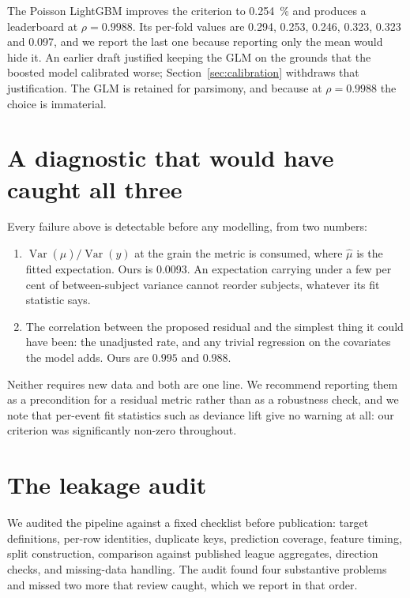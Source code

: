 \documentclass[11pt,a4paper]{article}
\begin{document}
The Poisson LightGBM improves the criterion to \SI{0.254}{\percent} and produces
a leaderboard at $\rho = 0.9988$. Its per-fold values are 0.294, 0.253, 0.246,
0.323, 0.323 and 0.097, and we report the last one because reporting only the
mean would hide it. An earlier draft justified keeping the GLM on the grounds
that the boosted model calibrated worse; Section~\ref{sec:calibration} withdraws
that justification. The GLM is retained for parsimony, and because at
$\rho = 0.9988$ the choice is immaterial.

\section{A diagnostic that would have caught all three}
\label{sec:diagnostic}

Every failure above is detectable before any modelling, from two numbers:

\begin{enumerate}
\item $\operatorname{Var}(\hat{\mu}) / \operatorname{Var}(y)$ at the grain the
metric is consumed, where $\hat\mu$ is the fitted expectation. Ours is
\num{0.0093}. An expectation carrying under a few per cent of between-subject
variance cannot reorder subjects, whatever its fit statistic says.
\item The correlation between the proposed residual and the simplest thing it
could have been: the unadjusted rate, and any trivial regression on the
covariates the model adds. Ours are $0.995$ and $0.988$.
\end{enumerate}

Neither requires new data and both are one line. We recommend reporting them as a
precondition for a residual metric rather than as a robustness check, and we note
that per-event fit statistics such as deviance lift give no warning at all: our
criterion was significantly non-zero throughout.

\section{The leakage audit}
\label{sec:audit}

We audited the pipeline against a fixed checklist before publication: target
definitions, per-row identities, duplicate keys, prediction coverage, feature
timing, split construction, comparison against published league aggregates,
direction checks, and missing-data handling. The audit found four substantive
problems and missed two more that review caught, which we report in that order.
\end{document}
